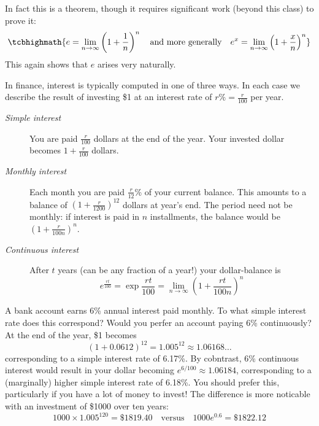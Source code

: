 In fact this is a theorem, though it requires significant work (beyond this class) to prove it:
\[
	\tcbhighmath{e=\lim_{n\to\infty}\left(1+\frac 1n\right)^n\quad\text{and more generally}\quad e^x =\lim_{n\to\infty}\left(1+\frac xn\right)^n}
\]
This again shows that $e$ arises very naturally.


In finance, interest is typically computed in one of three ways. In each case we describe the result of investing \$1 at an interest rate of $r\%=\frac r{100}$ per year.
\begin{description}
	\item[\normalfont\emph{Simple interest}] You are paid $\frac r{100}$ dollars at the end of the year. Your invested dollar becomes $1+\frac r{100}$ dollars.
	\item[\normalfont\emph{Monthly interest}] Each month you are paid $\frac r{12}$\% of your current balance. This amounts to a balance of $(1+\frac r{1200})^{12}$ dollars at year's end. The period need not be monthly: if interest is paid in $n$ installments, the balance would be $(1+\frac r{100n})^{n}$.
	\item[\normalfont\emph{Continuous interest}] After $t$ years (can be any fraction of a year!) your dollar-balance is
	\[
		e^{\frac{rt}{100}}=\exp\frac{rt}{100} =\lim_{n\to\infty}\left(1+\frac{rt}{100n}\right)^n
	\]
\end{description}

\begin{example}{}{}
	A bank account earns 6\% annual interest paid monthly. To what simple interest rate does this correspond? Would you perfer an account paying 6\% continuously?\smallbreak
	At the end of the year, \$1 becomes
	\[
	 	\left(1+{0.06}{12}\right)^{12}=1.005^{12}\approx 1.06168\ldots
	\]
	corresponding to a simple interest rate of 6.17\%. By cobntrast, 6\% continuous interest would result in your dollar becoming $e^{6/100}\approx 1.06184$, corresponding to a (marginally) higher simple interest rate of 6.18\%. You should prefer this, particularly if you have a lot of money to invest! The difference is more noticable with an investment of \$1000 over ten years:
	\[
		1000\times 1.005^{120}=\$1819.40
		\quad\text{versus}\quad
		1000e^{0.6}=\$1822.12
	\]
\end{example}

\goodbreak

